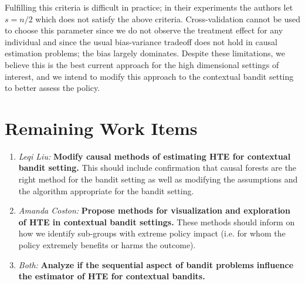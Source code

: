 \documentclass{article}
\begin{document}
Fulfilling this criteria is difficult in practice; in their experiments the authors let $s= n/2$ which does not satisfy the above criteria. Cross-validation cannot be used to choose this parameter since we do not observe the treatment effect for any individual and since the usual bias-variance tradeoff does not hold in causal estimation problems; the bias largely dominates. %
Despite these limitations, we believe this is the best current approach for the high dimensional settings of interest, and we intend to modify this approach to the contextual bandit setting to better assess the policy.




\section{Remaining Work Items}
\begin{enumerate}
    \item \textit{Leqi Liu:} \textbf{Modify causal methods of estimating HTE for contextual bandit setting.} This should include confirmation that causal forests are the right method for the bandit setting as well as modifying the assumptions and the algorithm appropriate for the bandit setting. 
    \item \textit{Amanda Coston:} \textbf{Propose methods for visualization and exploration of HTE in contextual bandit settings.} These methods should inform on how we identify sub-groups with extreme policy impact (i.e. for whom the policy extremely benefits or harms the outcome). 
    \item \textit{Both:} \textbf{Analyze if the sequential aspect of bandit problems influence the estimator of HTE for contextual bandits.} 
\end{enumerate}



\end{document}
